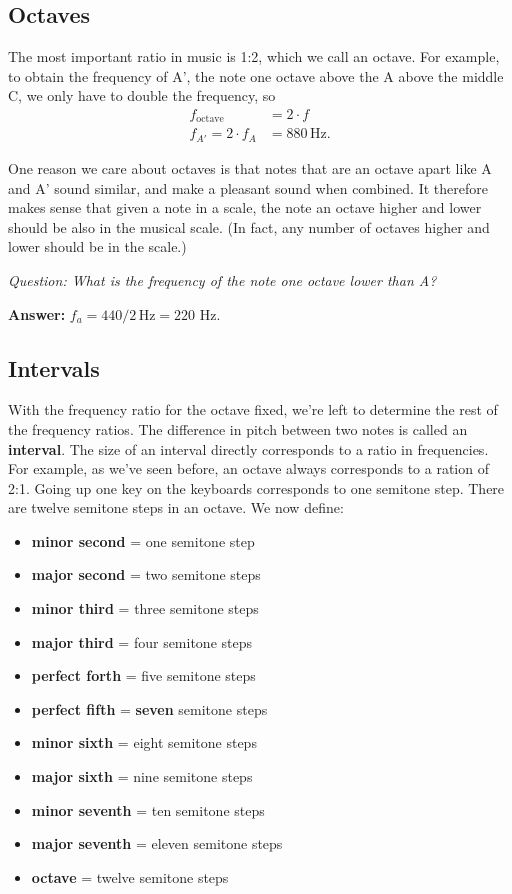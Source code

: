 \subsection{Octaves}

The most important ratio in music is 1:2, which we call an octave. 
For example, to obtain the frequency of A', the note one octave above the A above the middle C, we only have to double the frequency, so
\begin{align}
    f_{\text{octave}} &= 2 \cdot f \\
    f_{A'} = 2 \cdot f_A &= 880\, \text{Hz}.
\end{align}

One reason we care about octaves is that notes that are an octave apart like A and A' sound similar, and make a pleasant sound when combined. It therefore makes sense that given a note in a scale, the note an octave higher and lower should be also in the musical scale. (In fact, any number of octaves higher and lower should be in the scale.)

\textit{Question: What is the frequency of the note one octave lower than A?}

\textbf{Answer:} $f_a = 440/2\,\text{Hz} = 220$ Hz. 

\subsection{Intervals}

With the frequency ratio for the octave fixed, we're left to determine the rest of the frequency ratios. The difference in pitch between two notes is called an \textbf{interval}. The size of an interval directly corresponds to a ratio in frequencies. For example, as we've seen before, an octave always corresponds to a ration of 2:1. 
Going up one key on the keyboards corresponds to one semitone step. There are twelve semitone steps in an octave. We now define:
\begin{itemize}
    \item \textbf{minor second} = one semitone step
    \item \textbf{major second} = two semitone steps
    \item \textbf{minor third} = three semitone steps
    \item \textbf{major third} = four semitone steps
    \item \textbf{perfect forth} = five semitone steps 
    \item \textbf{perfect fifth} = \textbf{seven} semitone steps 
    \item \textbf{minor sixth} = eight semitone steps 
    \item \textbf{major sixth} = nine semitone steps 
    \item \textbf{minor seventh} = ten semitone steps 
    \item \textbf{major seventh} = eleven semitone steps 
    \item \textbf{octave} = twelve semitone steps
\end{itemize}

